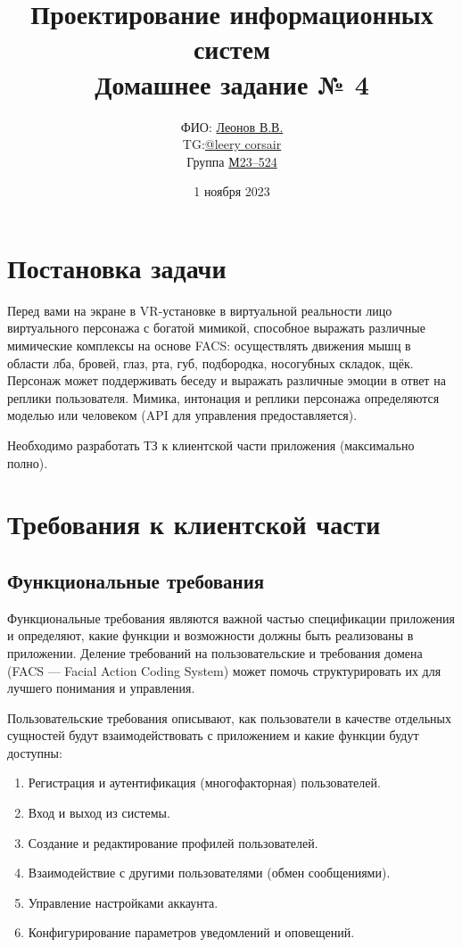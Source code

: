 \documentclass[a4paper,14pt]{extarticle}
\title{Проектирование информационных систем  \\
Домашнее задание № 4}
\author{ФИО: \underline{Леонов В.В.}\\TG:\underline{@leery\underline{ }corsair}\\Группа \underline{М23--524}}
\date{1 ноября 2023}
\begin{document}
\maketitle

\tableofcontents
\newpage
\begin{spacing}{1.5}

\section{Постановка задачи}

\hspace{\parindent} Перед вами {\color{BrickRed}на экране} {\color{RoyalBlue}в VR-установке в виртуальной реальности} лицо виртуального персонажа с богатой мимикой, способное выражать различные мимические комплексы на основе FACS: осуществлять движения мышц в области лба, бровей, глаз, рта, губ, подбородка, носогубных складок, щёк. Персонаж может поддерживать беседу и выражать различные эмоции в ответ на реплики пользователя. Мимика, интонация и реплики персонажа определяются моделью или человеком (API для управления предоставляется). 

Необходимо разработать ТЗ к клиентской части приложения (максимально полно).

\section{Требования к клиентской части}

\subsection{Функциональные требования}

\hspace{\parindent} Функциональные требования являются важной частью спецификации приложения и определяют, какие функции и возможности должны быть реализованы в приложении. Деление требований на пользовательские и требования домена (FACS --- Facial Action Coding System) может помочь структурировать их для лучшего понимания и управления.

Пользовательские требования описывают, как пользователи в качестве отдельных сущностей будут взаимодействовать с приложением и какие функции будут доступны:
\begin{enumerate}[label*=\arabic*.]
    \item Регистрация и аутентификация (многофакторная) пользователей.
    \item Вход и выход из системы.
    \item Создание и редактирование профилей пользователей.
    \item Взаимодействие с другими пользователями (обмен сообщениями).
    \item Управление настройками аккаунта.
    \item Конфигурирование параметров уведомлений и оповещений.
\end{enumerate}


\end{spacing}
\end{document}
